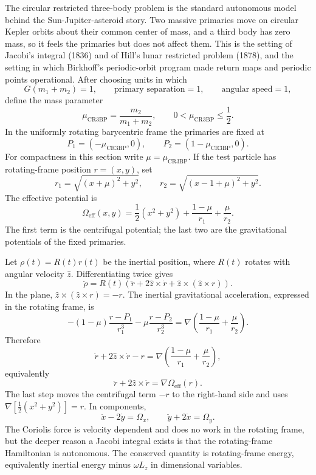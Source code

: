 The circular restricted three-body problem is the standard autonomous model
behind the Sun-Jupiter-asteroid story. Two massive primaries move on circular
Kepler orbits about their common center of mass, and a third body has zero
mass, so it feels the primaries but does not affect them. This is the setting
of Jacobi's integral (1836) and of Hill's lunar restricted problem (1878), and
the setting in which Birkhoff's periodic-orbit program made return maps and
periodic points operational. After choosing units
in which
\[
  G(m_1+m_2)=1,\qquad
  \text{primary separation}=1,\qquad
  \text{angular speed}=1,
\]
define the mass parameter
\[
  \mu_{\mathrm{CR3BP}}=\frac{m_2}{m_1+m_2},
  \qquad
  0<\mu_{\mathrm{CR3BP}}\leq \frac12.
\]
In the uniformly rotating barycentric frame the primaries are fixed at
\[
  P_1=(-\mu_{\mathrm{CR3BP}},0),
  \qquad
  P_2=(1-\mu_{\mathrm{CR3BP}},0).
\]
For compactness in this section write \(\mu=\mu_{\mathrm{CR3BP}}\). If the
test particle has rotating-frame position \(r=(x,y)\), set
\[
  r_1=\sqrt{(x+\mu)^2+y^2},
  \qquad
  r_2=\sqrt{(x-1+\mu)^2+y^2}.
\]
The effective potential is
\[
  \boxed{
  \Omega_{\mathrm{eff}}(x,y)
  =
  \frac12(x^2+y^2)
  +
  \frac{1-\mu}{r_1}
  +
  \frac{\mu}{r_2}.
  }
\]
The first term is the centrifugal potential; the last two are the gravitational
potentials of the fixed primaries.

\begin{derivation}
Let \(\rho(t)=R(t)r(t)\) be the inertial position, where \(R(t)\) rotates with
angular velocity \(\hat z\). Differentiating twice gives
\[
  \ddot\rho
  =
  R(t)\left(
    \ddot r+2\hat z\times\dot r+\hat z\times(\hat z\times r)
  \right).
\]
In the plane, \(\hat z\times(\hat z\times r)=-r\). The inertial gravitational
acceleration, expressed in the rotating frame, is
\[
  - (1-\mu)\frac{r-P_1}{r_1^3}
  - \mu\frac{r-P_2}{r_2^3}
  =
  \nabla\left(\frac{1-\mu}{r_1}+\frac{\mu}{r_2}\right).
\]
Therefore
\[
  \ddot r+2\hat z\times\dot r-r
  =
  \nabla\left(\frac{1-\mu}{r_1}+\frac{\mu}{r_2}\right),
\]
equivalently
\[
  \boxed{
  \ddot r+2\hat z\times\dot r=\nabla\Omega_{\mathrm{eff}}(r).
  }
\]
The last step moves the centrifugal term \(-r\) to the right-hand side and uses
\(\nabla[\frac12(x^2+y^2)]=r\).
In components,
\[
  \boxed{
  \ddot x-2\dot y=\Omega_x,
  \qquad
  \ddot y+2\dot x=\Omega_y.
  }
\]
The Coriolis force is velocity dependent and does no work in the rotating
frame, but the deeper reason a Jacobi integral exists is that the rotating-frame
Hamiltonian is autonomous. The conserved quantity is rotating-frame energy,
equivalently inertial energy minus \(\omega L_z\) in dimensional variables.
\end{derivation}

